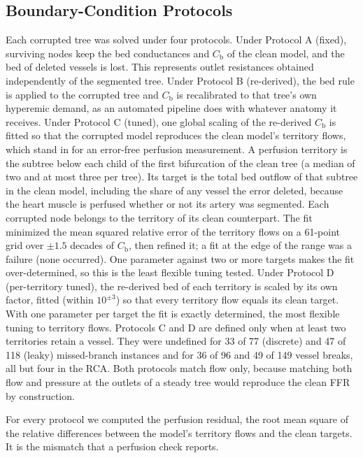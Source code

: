 \documentclass[journal,twoside,web]{ieeecolor}
\begin{document}
\subsection{Boundary-Condition Protocols}
Each corrupted tree was solved under four protocols. Under Protocol A (fixed), surviving
nodes keep the bed conductances and $C_\mathrm{b}$ of the clean model, and the bed of deleted vessels is lost. This represents
outlet resistances obtained independently of the segmented tree. Under Protocol B
(re-derived), the bed rule is applied to the corrupted tree and $C_\mathrm{b}$ is recalibrated to that tree's own hyperemic
demand, as an automated pipeline does with whatever anatomy it receives. Under Protocol C (tuned), one global
scaling of the re-derived $C_\mathrm{b}$ is fitted so that the corrupted model reproduces the clean model's territory
flows, which stand in for an error-free perfusion measurement. A perfusion territory is the subtree below each child of
the first bifurcation of the clean tree (a median of two and at most three per tree). Its target is the total bed outflow of that subtree in the clean model,
including the share of any vessel the error deleted, because the heart muscle is perfused whether or not its artery
was segmented. Each corrupted node belongs to the territory of its clean counterpart. The fit minimized the mean squared relative error of the territory flows on a 61-point grid over $\pm 1.5$ decades
of $C_\mathrm{b}$, then refined it; a fit at the edge of the range was a failure (none occurred).
One parameter against two or more targets makes the fit over-determined, so this is the least flexible tuning tested. Under Protocol D (per-territory tuned), the re-derived bed of each territory is scaled by its
own factor, fitted (within $10^{\pm 3}$) so that every territory flow equals its clean target. With one parameter per target the fit is
exactly determined, the most flexible tuning to territory flows. Protocols C and D are defined only when at least two territories retain a vessel. They were undefined for 33 of
77 (discrete) and 47 of 118 (leaky) missed-branch instances and for 36 of 96 and 49 of 149 vessel breaks, all but
four in the RCA. Both protocols match
flow only, because matching both flow and pressure at the outlets of a steady tree would reproduce the clean FFR by
construction.

For every protocol we computed the perfusion residual, the root mean square of the relative differences between the
model's territory flows and the clean targets. It is the mismatch that a perfusion check reports.
\end{document}

